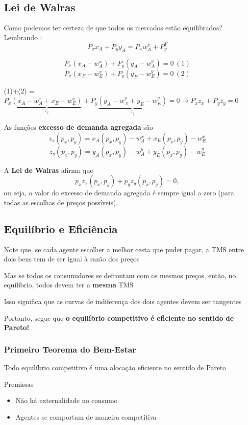 \documentclass[a4paper,12pt]{article}[abntex2]
\begin{document}
\subsection{\textbf{Lei de Walras}}

Como podemos ter certeza de que todos os mercados estão equilibrados? Lembrando :
\[
P_xx_A+P_yy_A=P_xw_A^x+P_y^Y
\]

\[
P_x(x_A-w_A^x)+P_y(y_A-w_A^y) = 0 \ (1)
\]
\[
P_x(x_E-w_E^x)+P_y(y_E-w_E^y) = 0 \ (2)
\]

(1)+(2) = $P_x\underbrace{(x_A-w_A^x+x_E-w_E^x)}_{z_x}+P_y\underbrace{(y_A-w_A^y+y_E-w_E^y)}_{z_y}=0\rightarrow P_xz_x+P_yz_y=0$

As funções \textbf{excesso de demanda agregada} são
\[
z_x(p_x, p_y) = x_A(p_x, p_y) - w_A^x + x_E(p_x, p_y) - w_E^x
\]
\[
z_y(p_x, p_y) = y_A(p_x, p_y) - w_A^y + y_E(p_x, p_y) - w_E^y
\]

A \textbf{Lei de Walras} afirma que
\[
p_x z_x(p_x, p_y) + p_y z_y(p_x, p_y) = 0,
\]
ou seja, o valor do excesso de demanda agregada é sempre igual a zero (para todas as escolhas de preços possíveis).


\subsection{\textbf{Equilíbrio e Eficiência}}

Note que, se cada agente escolher a melhor cesta que puder pagar, a TMS entre dois bens tem de ser igual à razão dos preços

Mas se todos os consumidores se defrontam com os mesmos preços, então, no equilíbrio, todos devem ter a \textbf{mesma} TMS

Isso significa que as curvas de indiferença dos dois agentes devem ser tangentes

Portanto, segue que \textbf{o equilíbrio competitivo é eficiente no sentido de Pareto!}

\subsubsection{\textbf{Primeiro Teorema do Bem-Estar}}

Todo equilíbrio competitivo é uma alocação eficiente no sentido de Pareto

Premissas\begin{itemize}
    \item Não há externalidade no consumo
    \item Agentes se comportam de maneira competitiva
\end{itemize}
\end{document}
